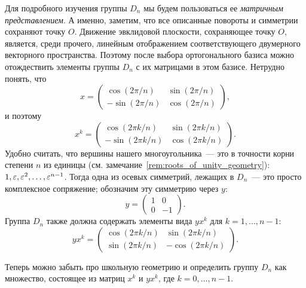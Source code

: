 Для подробного изучения группы $D_n$ мы будем пользоваться ее
{\it матричным представлением}. А именно, заметим, что все описанные
повороты и симметрии сохраняют точку $O$. Движение эвклидовой
плоскости, сохраняющее точку $O$, является, среди прочего, линейным
отображением соответствующего двумерного векторного
пространства. Поэтому после выбора ортогонального базиса можно
отождествить элементы группы $D_n$ с их матрицами в этом базисе.
Нетрудно понять, что
$$
x = \begin{pmatrix}\cos(2\pi/n) & \sin(2\pi/n)\\
-\sin(2\pi/n) & \cos(2\pi/n)\end{pmatrix},
$$
и поэтому
$$
x^k = \begin{pmatrix}\cos(2\pi k/n) & \sin(2\pi k/n)\\
-\sin(2\pi k/n) & \cos(2\pi k/n)\end{pmatrix}.
$$
Удобно считать, что вершины нашего многоугольника~--- это в точности
корни степени $n$ из единицы
(см. замечание~\ref{rem:roots_of_unity_geometry}):
$1,\varepsilon,\varepsilon^2,\dots,\varepsilon^{n-1}$.
Тогда одна из осевых симметрий, лежащих в $D_n$~--- это просто
комплексное сопряжение; обозначим эту симметрию через $y$:
$$
y = \begin{pmatrix} 1 & 0\\
0 & -1\end{pmatrix}.
$$
Группа $D_n$ также должна содержать элементы вида $yx^k$ для
$k=1,\dots,n-1$:
$$
yx^k = \begin{pmatrix}\cos(2\pi k/n) & \sin(2\pi k/n)\\
\sin(2\pi k/n) & -\cos(2\pi k/n)\end{pmatrix}.
$$

Теперь можно забыть про школьную геометрию и определить группу $D_n$
как множество, состоящее из матриц $x^k$ и $yx^k$, где
$k=0,\dots,n-1$.

